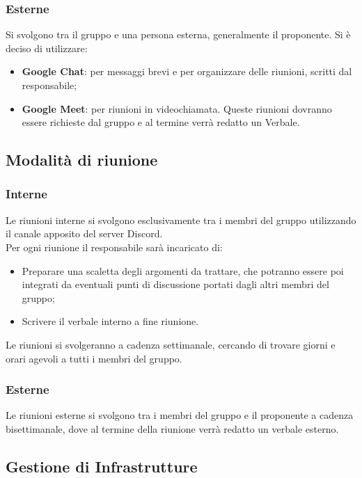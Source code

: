 \subsubsection{Esterne}
Si svolgono tra il gruppo e una persona esterna, generalmente il proponente. Si
è deciso di utilizzare:
\begin{itemize}
    \item \textbf{Google Chat}: per messaggi brevi e per organizzare delle riunioni, scritti dal responsabile;
    \item \textbf{Google Meet}: per riunioni in videochiamata. Queste riunioni dovranno essere richieste
          dal gruppo e al termine verrà redatto un Verbale.
\end{itemize}

\subsection{Modalità di riunione}
\subsubsection{Interne}
Le riunioni interne si svolgono esclusivamente tra i membri del gruppo
utilizzando il canale apposito del server Discord.\\ Per ogni riunione il
responsabile sarà incaricato di:
\begin{itemize}
    \item Preparare una scaletta degli argomenti da trattare, che potranno essere poi
          integrati da eventuali punti di discussione portati dagli altri membri del
          gruppo;
    \item Scrivere il verbale interno a fine riunione.
\end{itemize}

Le riunioni si svolgeranno a cadenza settimanale, cercando di trovare giorni e
orari agevoli a tutti i membri del gruppo.

\subsubsection{Esterne}
Le riunioni esterne si svolgono tra i membri del gruppo e il proponente a
cadenza bisettimanale, dove al termine della riunione verrà redatto un verbale
esterno.

\subsection{Gestione di Infrastrutture}
